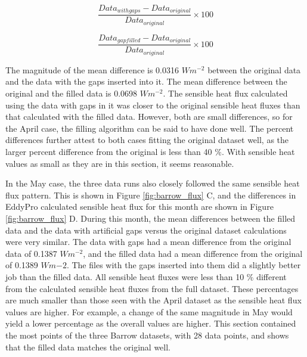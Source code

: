 \begin{equation}\label{eq:withgaps}
\frac{Data_{with gaps} - Data_{original}}{Data_{original}} \times 100
\end{equation}

\begin{equation}\label{eq:withoutgaps}
\frac{Data_{gap filled} - Data_{original}}{Data_{original}} \times 100
\end{equation}

The magnitude of the mean difference is 0.0316 $Wm^{-2}$ between the original data and the data with the gaps inserted into it. The mean difference between the original and the filled data is 0.0698 $Wm^{-2}$. The sensible heat flux calculated using the data with gaps in it was closer to the original sensible heat fluxes than that calculated with the filled data. However, both are small differences, so for the April case, the filling algorithm can be said to have done well.  The percent differences further attest to both cases fitting the original dataset well, as the larger percent difference from the original is less than 40 $\%$. With sensible heat values as small as they are in this section, it seems reasonable.

In the May case, the three data runs also closely followed the same sensible heat flux pattern. This is shown in Figure \ref{fig:barrow_flux} C, and the differences in EddyPro calculated sensible heat flux for this month are shown in Figure \ref{fig:barrow_flux} D. During this month, the mean differences between the filled data and the data with artificial gaps versus the original dataset calculations were very similar. The data with gaps had a mean difference from the original data of 0.1387 $Wm^{-2}$, and the filled data had a mean difference from the original of 0.1389 $Wm{-2}$. The files with the gaps inserted into them did a slightly better job than the filled data. All sensible heat fluxes were less than 10 $\%$ different from the calculated sensible heat fluxes from the full dataset. These percentages are much smaller than those seen with the April dataset as the sensible heat flux values are higher. For example, a change of the same magnitude in May would yield a lower percentage as the overall values are higher. This section contained the most points of the three Barrow datasets, with 28 data points, and shows that the filled data matches the original well. 


